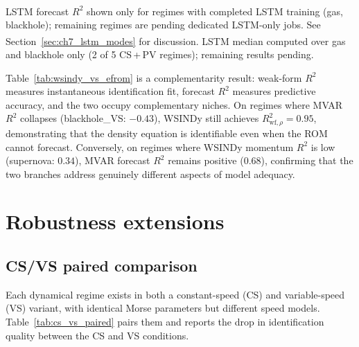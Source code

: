 \begin{table}[ht]
\smallskip
{\footnotesize \textsuperscript{\dag}LSTM forecast $R^2$ shown only
for regimes with completed LSTM training (gas, blackhole); remaining
regimes are pending dedicated LSTM-only jobs.
See Section~\ref{sec:ch7_lstm_modes} for discussion.
\textsuperscript{\ddag}LSTM median computed over gas and blackhole only
(2 of 5 CS\,+\,PV regimes); remaining results pending.}
\end{table}

Table~\ref{tab:wsindy_vs_efrom} is a complementarity result: weak-form $R^2$
measures instantaneous identification fit, forecast $R^2$ measures predictive
accuracy, and the two occupy complementary niches.  On regimes where
MVAR~$R^2$ collapses (blackhole\_VS: $-0.43$), WSINDy still achieves
$R^2_{\text{wf},\rho} = 0.95$, demonstrating that the density equation is
identifiable even when the ROM cannot forecast.  Conversely, on regimes where
WSINDy momentum $R^2$ is low (supernova: $0.34$), MVAR forecast $R^2$
remains positive ($0.68$), confirming that the two branches address
genuinely different aspects of model adequacy.

\section{Robustness extensions}
\label{sec:wsindy_robustness}

\subsection{CS/VS paired comparison}
\label{sec:wsindy_cs_vs_paired}

Each dynamical regime exists in both a constant-speed (CS) and
variable-speed (VS) variant, with identical Morse parameters but
different speed models.  Table~\ref{tab:cs_vs_paired} pairs them and
reports the drop in identification quality between the CS and VS conditions.

